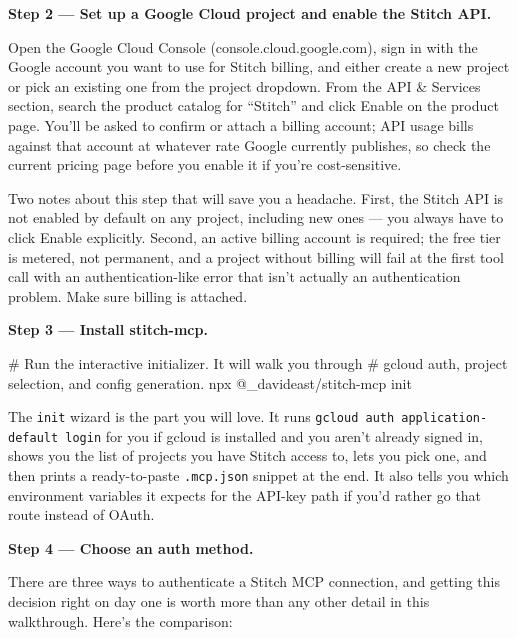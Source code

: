 \documentclass[11pt,letterpaper,openany]{book}
\begin{document}
\begin{gsdscenario}
\vspace{6pt}
\textbf{Step 2 --- Set up a Google Cloud project and enable the Stitch API.}
\vspace{4pt}

Open the Google Cloud Console (console.cloud.google.com), sign in with
the Google account you want to use for Stitch billing, and either
create a new project or pick an existing one from the project
dropdown. From the API \& Services section, search the product catalog
for ``Stitch'' and click Enable on the product page. You'll be asked
to confirm or attach a billing account; API usage bills against that
account at whatever rate Google currently publishes, so check the
current pricing page before you enable it if you're cost-sensitive.

Two notes about this step that will save you a headache. First, the
Stitch API is not enabled by default on any project, including new
ones --- you always have to click Enable explicitly. Second, an active
billing account is required; the free tier is metered, not permanent,
and a project without billing will fail at the first tool call with an
authentication-like error that isn't actually an authentication
problem. Make sure billing is attached.

\vspace{6pt}
\textbf{Step 3 --- Install stitch-mcp.}
\vspace{4pt}

\begin{gsdbash}
# Run the interactive initializer. It will walk you through
# gcloud auth, project selection, and config generation.
npx @_davideast/stitch-mcp init
\end{gsdbash}

The \texttt{init} wizard is the part you will love. It runs
\texttt{gcloud auth application-default login} for you if gcloud is
installed and you aren't already signed in, shows you the list of
projects you have Stitch access to, lets you pick one, and then prints
a ready-to-paste \texttt{.mcp.json} snippet at the end. It also tells
you which environment variables it expects for the API-key path if
you'd rather go that route instead of OAuth.

\vspace{6pt}
\textbf{Step 4 --- Choose an auth method.}
\vspace{4pt}

There are three ways to authenticate a Stitch MCP connection, and
getting this decision right on day one is worth more than any other
detail in this walkthrough. Here's the comparison:


\end{gsdscenario}
\end{document}
